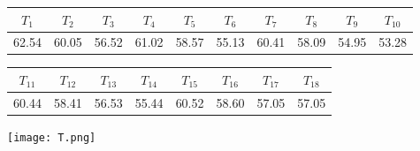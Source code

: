 \documentclass[a4paper, 12pt]{article}
\begin{document}
\begin{enumerate}
\begin{table}[h]
    \centering
    \begin{tabular}{|c|c|c|c|c|c|c|c|c|c|}
        \toprule
        $T_1$&$T_2$&$T_3$&$T_4$&$T_5$&$T_6$&$T_7$&$T_8$&$T_9$&$T_{10}$\\ 
        \midrule
        62.54& 60.05& 56.52& 61.02 & 58.57& 55.13& 60.41& 58.09& 54.95& 53.28 \\ 
  \bottomrule	
    \end{tabular}
\end{table}
\begin{table}[h]
    \centering
    \begin{tabular}{|c|c|c|c|c|c|c|c|}
        \toprule
        $T_{11}$&$T_{12}$&$T_{13}$&$T_{14}$&$T_{15}$&$T_{16}$&$T_{17}$&$T_{18}$\\ 
        \midrule
        60.44& 58.41& 56.53& 55.44& 60.52& 58.60& 57.05& 57.05 \\ 
  \bottomrule
    \end{tabular}
\end{table}

\begin{center}
\texttt{[image: T.png]}
\end{center}

\end{enumerate}
\end{document}
